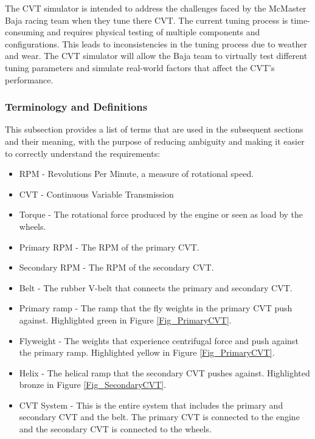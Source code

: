 \documentclass[12pt]{article}
\begin{document}
The CVT simulator is intended to address the challenges faced by the McMaster Baja racing team when they tune there CVT.
The current tuning process is time-consuming and requires physical testing of multiple components and configurations. This leads to inconsistencies in the tuning process due to weather and wear.
The CVT simulator will allow the Baja team to virtually test different tuning parameters and simulate real-world factors that affect the CVT's performance.

\subsubsection{Terminology and  Definitions}

This subsection provides a list of terms that are used in the subsequent
sections and their meaning, with the purpose of reducing ambiguity and making it
easier to correctly understand the requirements:

\begin{itemize}
  \item RPM - Revolutions Per Minute, a measure of rotational speed.
  \item CVT - Continuous Variable Transmission
  \item Torque - The rotational force produced by the engine or seen as load by the wheels. 
  \item Primary RPM - The RPM of the primary CVT.
  \item Secondary RPM - The RPM of the secondary CVT.
  \item Belt - The rubber V-belt that connects the primary and secondary CVT.
  \item Primary ramp - The ramp that the fly weights in the primary CVT push against. Highlighted green in Figure \ref{Fig_PrimaryCVT}.
  \item Flyweight - The weights that experience centrifugal force and push against the primary ramp. Highlighted yellow in Figure \ref{Fig_PrimaryCVT}.
  \item Helix - The helical ramp that the secondary CVT pushes against. Highlighted bronze in Figure \ref{Fig_SecondaryCVT}.
  \item CVT System - This is the entire system that includes the primary and secondary CVT and the belt. The primary CVT is connected to the engine and the secondary CVT is connected to the wheels.
\end{itemize}
\end{document}
